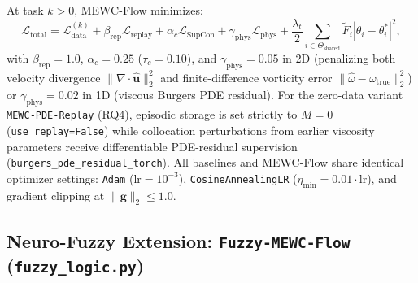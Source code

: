\documentclass[11pt,a4paper]{article}
\begin{document}
At task $k > 0$, MEWC-Flow minimizes:
\begin{equation}
\mathcal{L}_{\text{total}} = \mathcal{L}_{\text{data}}^{(k)} + \beta_{\text{rep}} \mathcal{L}_{\text{replay}} + \alpha_c \mathcal{L}_{\text{SupCon}} + \gamma_{\text{phys}} \mathcal{L}_{\text{phys}} + \frac{\lambda_t}{2} \sum_{i \in \Theta_{\text{shared}}} \tilde{F}_i \left|\theta_i - \theta_i^*\right|^2,
\end{equation}
with $\beta_{\text{rep}} = 1.0$, $\alpha_c = 0.25$ ($\tau_c = 0.10$), and $\gamma_{\text{phys}} = 0.05$ in 2D (penalizing both velocity divergence $\|\nabla \cdot \hat{\mathbf{u}}\|_2^2$ and finite-difference vorticity error $\|\hat{\omega} - \omega_{\text{true}}\|_2^2$) or $\gamma_{\text{phys}} = 0.02$ in 1D (viscous Burgers PDE residual). For the zero-data variant \texttt{MEWC-PDE-Replay} (RQ4), episodic storage is set strictly to $M = 0$ (\texttt{use\_replay=False}) while collocation perturbations from earlier viscosity parameters receive differentiable PDE-residual supervision (\texttt{burgers\_pde\_residual\_torch}). All baselines and MEWC-Flow share identical optimizer settings: \texttt{Adam} ($\text{lr} = 10^{-3}$), \texttt{CosineAnnealingLR} ($\eta_{\min} = 0.01 \cdot \text{lr}$), and gradient clipping at $\|\mathbf{g}\|_2 \le 1.0$.

\subsection{Neuro-Fuzzy Extension: \texttt{Fuzzy-MEWC-Flow} (\texttt{fuzzy\_logic.py})}
\end{document}
